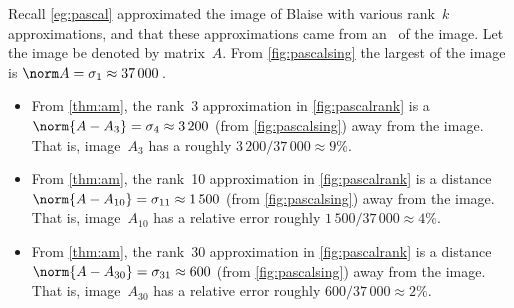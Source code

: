 \begin{example} 
Recall \cref{eg:pascal} approximated the image of Blaise  with various rank~\(k\) approximations, and that
these approximations came from an \svd\ of the image.
Let the image be denoted by matrix~\(A\).
From \cref{fig:pascalsing} the largest  of the image is \(\norm A=\sigma_1\approx37\,000\)\,.
\begin{itemize}
\item From  \cref{thm:am}, the rank~3 approximation in \cref{fig:pascalrank} is a  \(\norm{A-A_3}=\sigma_4\approx 3\,200\) (from \cref{fig:pascalsing}) away from the image.  
That is, image~\(A_3\) has a  roughly \(3\,200/37\,000\approx 9\%\).
\item From  \cref{thm:am}, the rank~10 approximation in \cref{fig:pascalrank} is a distance \(\norm{A-A_{10}}=\sigma_{11}\approx 1\,500\) (from \cref{fig:pascalsing}) away from the image.  
That is, image~\(A_{10}\) has a relative error roughly \(1\,500/37\,000 \approx 4\%\). 
\item From  \cref{thm:am}, the rank~30 approximation in \cref{fig:pascalrank} is a distance \(\norm{A-A_{30}}=\sigma_{31}\approx 600\) (from \cref{fig:pascalsing}) away from the image.  
That is, image~\(A_{30}\) has a relative error roughly \(600/37\,000 \approx 2\%\). 
\end{itemize}
\end{example}


